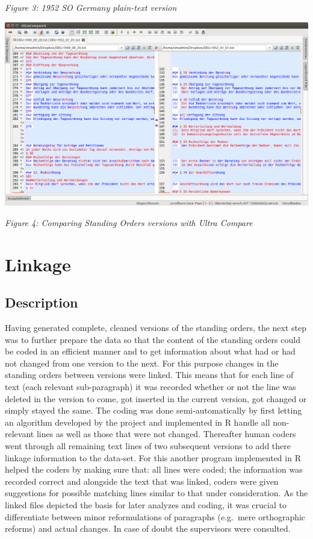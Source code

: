 \documentclass[10pt,]{article}
\begin{document}
\emph{Figure 3: 1952 SO Germany plain-text version}

\begin{center}
\includegraphics[width=\textwidth]{fig/fig3a.png}
\end{center}

\emph{Figure 4: Comparing Standing Orders versions with Ultra Compare}

\newpage

\section{Linkage}\label{linkage}

\subsection{Description}\label{description}

Having generated complete, cleaned versions of the standing orders, the
next step was to further prepare the data so that the content of the
standing orders could be coded in an efficient manner and to get
information about what had or had not changed from one version to the
next. For this purpose changes in the standing orders between versions
were linked. This means that for each line of text (each relevant
sub-paragraph) it was recorded whether or not the line was deleted in
the version to come, got inserted in the current version, got changed or
simply stayed the same. The coding was done semi-automatically by first
letting an algorithm developed by the project and implemented in R
handle all non-relevant lines as well as those that were not changed.
Thereafter human coders went through all remaining text lines of two
subsequent versions to add there linkage information to the data-set.
For this another program implemented in R helped the coders by making
sure that: all lines were coded; the information was recorded correct
and alongside the text that was linked, coders were given suggestions
for possible matching lines similar to that under consideration. As the
linked files depicted the basis for later analyzes and coding, it was
crucial to differentiate between minor reformulations of paragraphs
(e.g.~mere orthographic reforms) and actual changes. In case of doubt
the supervisors were consulted.
\end{document}
